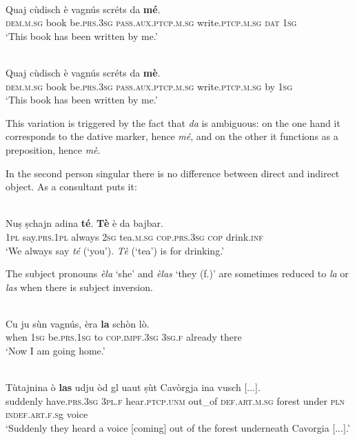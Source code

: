 \ea
\label{}
\\
\gll Quaj cùdisch è vagnús scréts da \textbf{mé}.\\
\textsc{dem.m.sg} book be.\textsc{prs.3sg} \textsc{pass.aux.ptcp.m.sg} write.\textsc{ptcp.m.sg} \textsc{dat} \textsc{1sg}\\
\glt `This book has been written by me.'
\z

\ea
\label{}
\\
\gll Quaj cùdisch è vagnús scréts da \textbf{mè}.\\
\textsc{dem.m.sg} book be.\textsc{prs.3sg} \textsc{pass.aux.ptcp.m.sg} write.\textsc{ptcp.m.sg} by \textsc{1sg}\\
\glt `This book has been written by me.'
\z

This variation is triggered by the fact that \textit{da} is ambiguous: on the one hand it corresponds to the dative marker, hence \textit{mé}, and on the other it functions as a preposition, hence \textit{mè}.

In the second person singular there is no difference between direct and indirect object. As a consultant puts it:

\ea
\label{}
\\
\gll  Nuṣ ṣchajn adina \textbf{té}. \textbf{Tè} è da bajbar.\\
\textsc{1pl} say.\textsc{prs.1pl} always \textsc{2sg} tea.\textsc{m.sg} \textsc{cop.prs.3sg} \textsc{cop} drink.\textsc{inf}\\
\glt `We always say \textit{té} (`you'). \textit{Tè} (`tea') is for drinking.'
\z

The subject pronouns \textit{èla} `she' and \textit{èlas} `they (f.)' are sometimes reduced to \textit{la} or \textit{las} when there is subject inversion.

\ea
\label{}
\\
\gll Cu ju sùn vagnús, èra \textbf{la} schòn lò.\\
when \textsc{1sg} be.\textsc{prs.1sg} to \textsc{cop.impf.3sg} \textsc{3sg.f} already there\\
\glt `Now I am going home.'
\z

\ea
\label{}
\\
\gll Tùtajnina ò \textbf{las} udju òd gl uaut ṣùt Cavòrgja ina vusch [...].\\
suddenly have.\textsc{prs.3sg} \textsc{3pl.f} hear.\textsc{ptcp.unm} out\_of \textsc{def.art.m.sg} forest under \textsc{pln} \textsc{indef.art.f.s}g voice\\
\glt `Suddenly they heard a voice [coming] out of the forest underneath Cavorgia [...].'
\z

